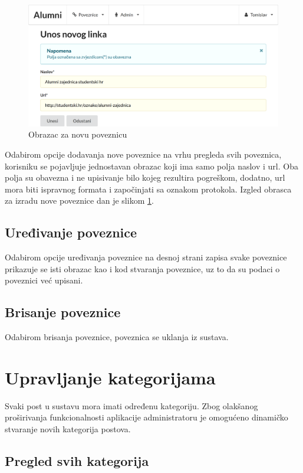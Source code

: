 \documentclass[zavrsni, numeric]{fer}
\begin{document}
\begin{figure}[H]
	\centering
	\includegraphics[width=13cm]{slike/nova-poveznica.png}
	\caption{Obrazac za novu poveznicu}
	\label{fig:nova-poveznica}
\end{figure}

Odabirom opcije dodavanja nove poveznice na vrhu pregleda svih poveznica, korisniku se pojavljuje jednostavan obrazac koji ima samo polja naslov i url. Oba polja su obavezna i ne upisivanje bilo kojeg rezultira pogreškom, dodatno, url mora biti ispravnog formata i započinjati sa oznakom protokola. Izgled obrasca za izradu nove poveznice dan je slikom \ref{fig:nova-poveznica}.

\subsection{Uređivanje poveznice}
Odabirom opcije uređivanja poveznice na desnoj strani zapisa svake poveznice prikazuje se isti obrazac kao i kod stvaranja poveznice, uz to da su podaci o poveznici već upisani. 

\subsection{Brisanje poveznice}
Odabirom brisanja poveznice, poveznica se uklanja iz sustava.

\section{Upravljanje kategorijama}
Svaki post u sustavu mora imati određenu kategoriju. Zbog olakšanog proširivanja funkcionalnosti aplikacije administratoru je omogućeno dinamičko stvaranje novih kategorija postova. 

\subsection{Pregled svih kategorija}
\end{document}
